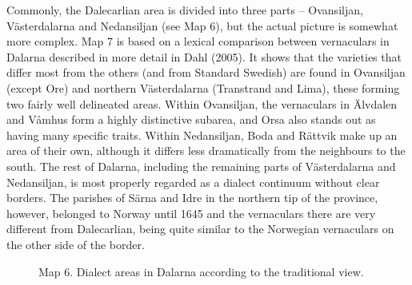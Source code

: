 Commonly, the Dalecarlian area is divided into three parts – Ovansiljan, Västerdalarna and Nedansiljan (see Map 6), but the actual picture is somewhat more complex. Map 7 is based on a lexical comparison between vernaculars in Dalarna described in more detail in Dahl (2005). It shows that the varieties that differ most from the others (and from Standard Swedish) are found in Ovansiljan (except Ore) and northern Västerdalarna (Transtrand and Lima), these forming two fairly well delineated areas. Within Ovansiljan, the vernaculars in Älvdalen and Våmhus form a highly distinctive subarea, and Orsa also stands out as having many specific traits. Within Nedansiljan, Boda and Rättvik make up an area of their own, although it differs less dramatically from the neighbours to the south. The rest of Dalarna, including the remaining parts of Västerdalarna and Nedansiljan, is most properly regarded as a dialect continuum without clear borders. The parishes of Särna and Idre in the northern tip of the province, however, belonged to Norway until 1645 and the vernaculars there are very different from Dalecarlian, being quite similar to the Norwegian vernaculars on the other side of the border. 

\clearpage%


\begin{figure}[h]
\centering
\begin{minipage}{6.42639in}
\label{bkm:Ref216765084}Map 6. Dialect areas in Dalarna according to the traditional view.
\end{minipage}
\end{figure}
\clearpage%


